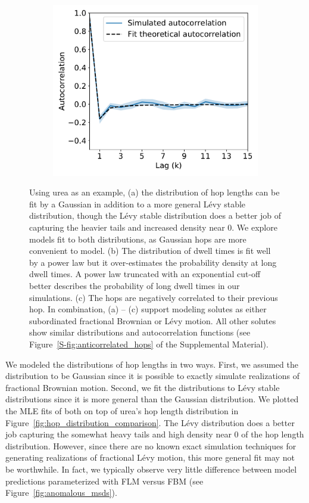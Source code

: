\documentclass[aps,pre,preprint,groupedaddress,longbibliography]{revtex4-2}
\begin{document}
\begin{figure}
\begin{subfigure}{0.325\textwidth}
  \includegraphics[width=\textwidth]{URE_hop_acf.pdf}
  \caption{}\label{fig:hop_acf}
  \end{subfigure}
  \caption{Using urea as an example, (a) the distribution of hop lengths can be
	  fit by a Gaussian in addition to a more general L\'evy stable
	  distribution, though the L\'evy stable distribution does a better job of
	  capturing the heavier tails and increased density near 0. We explore
	  models fit to both distributions, as Gaussian hops are more convenient
	  to model. (b) The distribution of dwell times is fit well by a power
	  law but it over-estimates the probability density at long dwell
	  times. A power law truncated with an exponential cut-off better
	  describes the probability of long dwell times in our simulations. (c)
	  The hops are negatively correlated to their previous hop. In
	  combination, (a) -- (c) support modeling solutes as either
	  subordinated fractional Brownian or L\'evy motion. All other solutes
	  show similar distributions and autocorrelation functions (see
	  Figure~\ref{S-fig:anticorrelated_hops} of the Supplemental Material).
  }\label{fig:anticorrelated_hops}
  \end{figure}
  
  We modeled the distributions of hop lengths in two ways. First, we assumed
  the distribution to be Gaussian since it is possible to exactly simulate
  realizations of fractional Brownian motion. Second, we fit the distributions
  to L\'evy stable distributions since it is more general than the Gaussian
  distribution. We plotted the MLE fits of both on top of urea's hop length
  distribution in Figure~\ref{fig:hop_distribution_comparison}. The L\'evy
  distribution does a better job capturing the somewhat heavy tails and high
  density near 0 of the hop length distribution. However, since there are no
  known exact simulation techniques for generating realizations of fractional
  L\'evy motion, this more general fit may not be worthwhile. In fact, we
  typically observe very little difference between model predictions
  parameterized with FLM versus FBM (see Figure~\ref{fig:anomalous_msds}).
\end{document}
